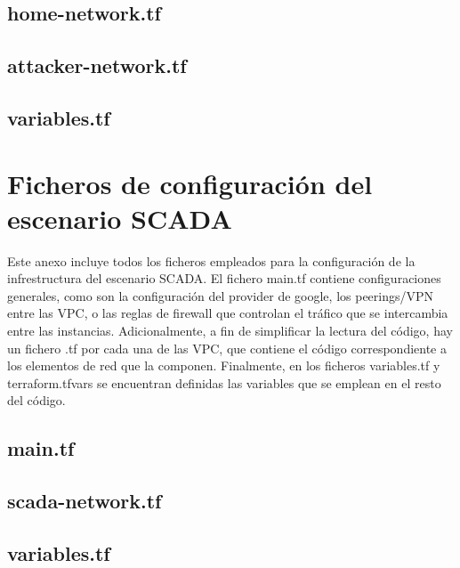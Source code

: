 \section*{home-network.tf}


\section*{attacker-network.tf}


\section*{variables.tf}


\chapter{Ficheros de configuración del escenario SCADA} \label{anx:scada}
  Este anexo incluye todos los ficheros empleados para la configuración de la infrestructura del escenario SCADA. El fichero main.tf contiene configuraciones generales, como son la configuración del provider de google, los peerings/VPN entre las VPC, o las reglas de firewall que controlan el tráfico que se intercambia entre las instancias. Adicionalmente, a fin de simplificar la lectura del código, hay un fichero .tf por cada una de las VPC, que contiene el código correspondiente a los elementos de red que la componen. Finalmente, en los ficheros variables.tf y terraform.tfvars se encuentran definidas las variables que se emplean en el resto del código.

\section*{main.tf} 


\section*{scada-network.tf}


\section*{variables.tf}


